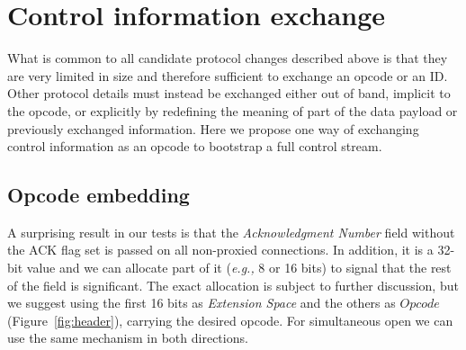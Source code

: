 \documentclass{sig-alternate-10pt}
\providecommand{\eg}{\emph{e.g.,} }
\begin{document}


\section{Control information exchange}
\label{sec:protocol}

What is common to all candidate protocol changes described above is that they are very limited in size and therefore sufficient to exchange an opcode or an ID. Other protocol details must instead be exchanged either out of band, implicit to the opcode, or explicitly by redefining the meaning of part of the data payload or previously exchanged information. Here we propose one way of exchanging control information as an opcode to bootstrap a full control stream.

\subsection{Opcode embedding}

A surprising result in our tests is that the \emph{Acknowledgment Number} field without the ACK flag set is passed on all non-proxied connections. In addition, it is a 32-bit value and we can allocate part of it (\eg 8 or 16 bits) to signal that the rest of the field is significant. The exact allocation is subject to further discussion, but we suggest using the first 16 bits as \emph{Extension Space} and the others as $Opcode$ (Figure~\ref{fig:header}), carrying the desired opcode. For simultaneous open we can use the same mechanism in both directions.
\end{document}
